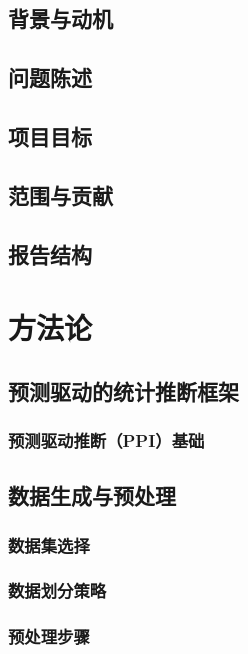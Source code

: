 \documentclass[12pt,a4paper]{article}
\begin{document}
\subsection{背景与动机}

\subsection{问题陈述}

\subsection{项目目标}

\subsection{范围与贡献}

\subsection{报告结构}

\section{方法论}

\subsection{预测驱动的统计推断框架}

\subsubsection{预测驱动推断（PPI）基础}


\subsection{数据生成与预处理}


\subsubsection{数据集选择}


\subsubsection{数据划分策略}

\subsubsection{预处理步骤}
\end{document}
